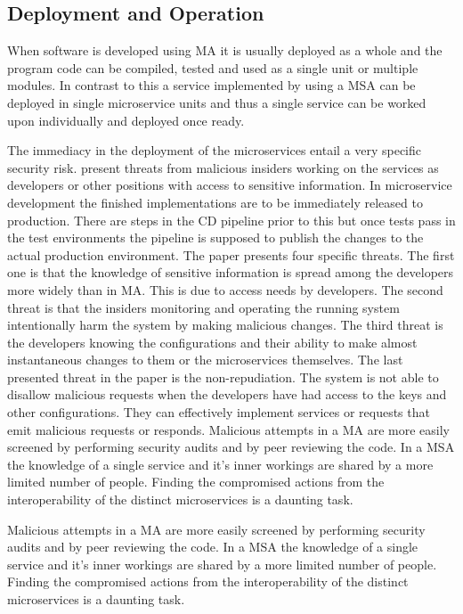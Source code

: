 \subsection{Deployment and Operation}
\begin{sloppypar}
    When software is developed using MA it is usually deployed as a whole and 
    the program code can be compiled, tested and used as a single unit or 
    multiple modules. In contrast to this a service implemented by using a MSA 
    can be deployed in single microservice units and thus a single service can 
    be worked upon individually and deployed once ready. 
\end{sloppypar}
\begin{sloppypar}
    The immediacy in the deployment of the microservices entail a very specific 
    security risk. \citet{integinside} present threats from malicious insiders 
    working on the services as developers or other positions with access to 
    sensitive information. In microservice development the finished 
    implementations are to be immediately released to production. There are 
    steps in the CD pipeline prior to this but once tests pass in the test 
    environments the pipeline is supposed to publish the changes to the actual 
    production environment. The paper presents four specific threats. The first 
    one is that the knowledge of sensitive information is spread among the 
    developers more widely than in MA. This is due to access needs by 
    developers. The second threat is that the insiders monitoring and operating 
    the running system intentionally harm the system by making malicious 
    changes. The third threat is the developers knowing the configurations and 
    their ability to make almost instantaneous changes to them or the 
    microservices themselves. The last presented threat in the paper is the 
    non-repudiation. The system is not able to disallow malicious requests when 
    the developers have had access to the keys and other configurations. They 
    can effectively implement services or requests that emit malicious requests 
    or responds. Malicious attempts in a MA are more easily screened by 
    performing security audits and by peer reviewing the code. In a MSA the 
    knowledge of a single service and it’s inner workings are shared by a more 
    limited number of people. Finding the compromised actions from the 
    interoperability of the distinct microservices is a daunting task.
\end{sloppypar}
\begin{sloppypar}
    Malicious attempts in a MA are more easily screened by performing security
    audits and by peer reviewing the code. In a MSA the knowledge of a single 
    service and it's inner workings are shared by a more limited number of people.
    Finding the compromised actions from the interoperability of the distinct 
    microservices is a daunting task.
\end{sloppypar}
\begin{sloppypar}
    
\end{sloppypar}

